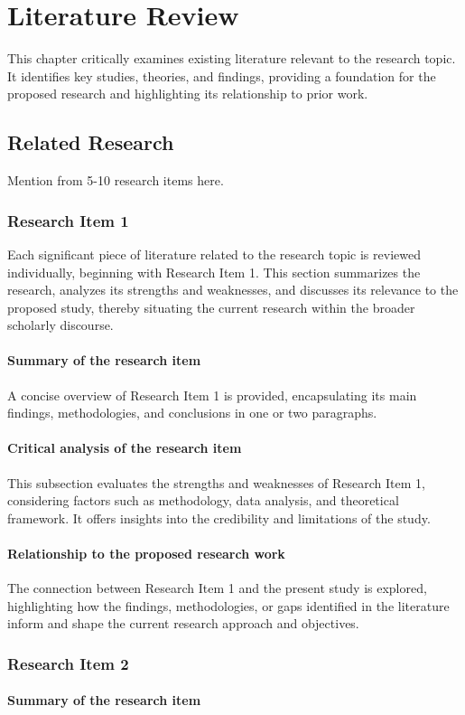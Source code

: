 \chapter{Literature Review}
This chapter critically examines existing literature relevant to the research topic. It identifies key studies, theories, and findings, providing a foundation for the proposed research and highlighting its relationship to prior work.
\section{Related Research}
Mention from 5-10 research items here.
\subsection{Research Item 1}
Each significant piece of literature related to the research topic is reviewed individually, beginning with Research Item 1. This section summarizes the research, analyzes its strengths and weaknesses, and discusses its relevance to the proposed study, thereby situating the current research within the broader scholarly discourse.
\subsubsection{Summary of the research item}
A concise overview of Research Item 1 is provided, encapsulating its main findings, methodologies, and conclusions in one or two paragraphs.
\subsubsection{Critical analysis of the research item}
This subsection evaluates the strengths and weaknesses of Research Item 1, considering factors such as methodology, data analysis, and theoretical framework. It offers insights into the credibility and limitations of the study.
\subsubsection{Relationship to the proposed research work}
The connection between Research Item 1 and the present study is explored, highlighting how the findings, methodologies, or gaps identified in the literature inform and shape the current research approach and objectives.
\subsection{Research Item 2}
\subsubsection{Summary of the research item}
